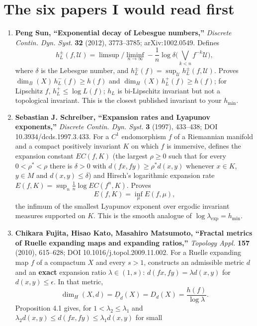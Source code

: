\documentclass[
]{article}
\begin{document}
\section{The six papers I would read
first}\label{the-six-papers-i-would-read-first}

\begin{enumerate}
\def\labelenumi{\arabic{enumi}.}
\item
  \textbf{Peng Sun, ``Exponential decay of Lebesgue numbers,''}
  \emph{Discrete Contin. Dyn. Syst.} \textbf{32} (2012), 3773--3785;
  arXiv:1002.0549. Defines \[
  h_L^\pm(f,\mathcal U)=\limsup/\liminf_{n\to\infty}-\frac1n\log\delta\bigl(\textstyle\bigvee_{k<n}f^{-k}\mathcal U\bigr),
  \] where \(\delta\) is the Lebesgue number, and
  \(h_L^\pm(f)=\sup_{\mathcal U}h_L^\pm(f,\mathcal U)\). Proves
  \(\dim_B(X)\,h_L^-(f)\ge h(f)\) and \(\dim_H(X)\,h_L^+(f)\ge h(f)\);
  for Lipschitz \(f\), \(h_L^+\le\log L(f)\); \(h_L\) is bi-Lipschitz
  invariant but not a topological invariant. This is the closest
  published invariant to your \(h_{\min}\).
\item
  \textbf{Sebastian J. Schreiber, ``Expansion rates and Lyapunov
  exponents,''} \emph{Discrete Contin. Dyn. Syst.} \textbf{3} (1997),
  433--438; DOI 10.3934/dcds.1997.3.433. For a \(C^1\) endomorphism
  \(f\) of a Riemannian manifold and a compact positively invariant
  \(K\) on which \(f\) is immersive, defines the expansion constant
  \(EC(f,K)\) (the largest \(\rho\ge0\) such that for every
  \(0<\rho^*<\rho\) there is \(\delta>0\) with
  \(d(fx,fy)\ge\rho^*d(x,y)\) whenever \(x\in K\), \(y\in M\) and
  \(d(x,y)\le\delta\)) and Hirsch's logarithmic expansion rate
  \(E(f,K)=\sup_n\frac1n\log EC(f^n,K)\). Proves \[
  E(f,K)=\inf_\mu E(f,\mu),
  \] the infimum of the smallest Lyapunov exponent over ergodic
  invariant measures supported on \(K\). This is the smooth analogue of
  \(\log\lambda_{\exp}=h_{\min}\).
\item
  \textbf{Chikara Fujita, Hisao Kato, Masahiro Matsumoto, ``Fractal
  metrics of Ruelle expanding maps and expanding ratios,''}
  \emph{Topology Appl.} \textbf{157} (2010), 615--628; DOI
  10.1016/j.topol.2009.11.002. For a Ruelle expanding map \(f\) of a
  compactum \(X\) and every \(s>1\), constructs an admissible metric
  \(d\) and an \textbf{exact} expansion ratio \(\lambda\in(1,s)\):
  \(d(fx,fy)=\lambda d(x,y)\) for \(d(x,y)\le\epsilon\). In that metric,
  \[
  \dim_H(X,d)=\underline D_d(X)=D_d(X)=\frac{h(f)}{\log\lambda}.
  \] Proposition 4.1 gives, for \(1<\lambda_2\le\lambda_1\) and
  \(\lambda_2 d(x,y)\le d(fx,fy)\le\lambda_1 d(x,y)\) for small

\end{enumerate}
\end{document}
